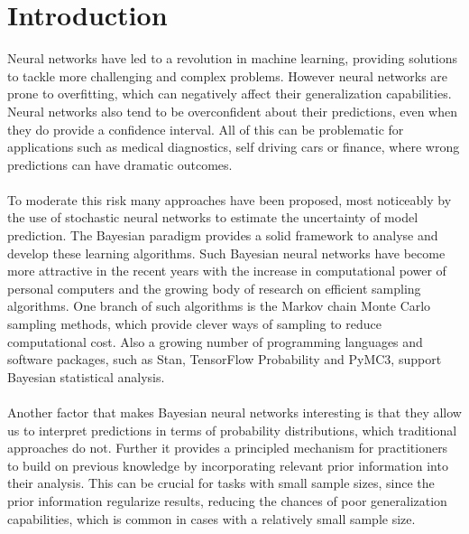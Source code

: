 \chapter{Introduction}
Neural networks have led to a revolution in machine learning, providing solutions to tackle more challenging and complex problems. However neural networks are prone to overfitting, which can negatively affect their generalization capabilities. Neural networks also tend to be overconfident about their predictions, even when they do provide a confidence interval. All of this can be problematic for applications such as medical diagnostics, self driving cars or finance, where wrong predictions can have dramatic outcomes. 
\\
\\
To moderate this risk many approaches have been proposed, most noticeably by the use of stochastic neural networks to estimate the uncertainty of model prediction. The Bayesian paradigm provides a solid framework to analyse and develop these learning algorithms. Such Bayesian neural networks have become more attractive in the recent years with the increase in computational power of personal computers and the growing body of research on efficient sampling algorithms. One branch of such algorithms is the Markov chain Monte Carlo sampling methods, which provide clever ways of sampling to reduce computational cost. Also a growing number of programming languages and software packages, such as Stan, TensorFlow Probability and PyMC3, support Bayesian statistical analysis. 
\\
\\
Another factor that makes Bayesian neural networks interesting is that they allow us to interpret predictions in terms of probability distributions, which traditional approaches do not. Further it provides a principled mechanism for practitioners to build on previous knowledge by incorporating relevant prior information into their analysis. This can be crucial for tasks with small sample sizes, since the prior information regularize results, reducing the chances of poor generalization capabilities, which is common in cases with a relatively small sample size. 
